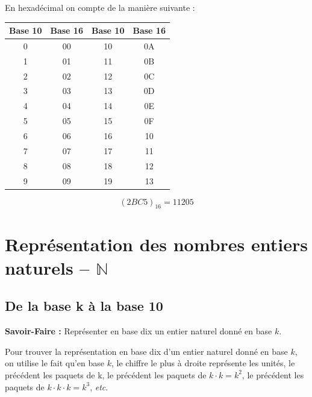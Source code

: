 \documentclass[10pt,fleqn]{article} %
\begin{document}
\begin{exemple}
\begin{minipage}[c]{.4\linewidth}
En hexadécimal on compte de la manière suivante : 
\begin{center}
\begin{tabular}{|c|c||c|c|}
\hline
Base 10 & Base 16 & Base 10 & Base 16\\
\hline \hline
0 & 00 & 10 & 0A \\ \hline
1 & 01 & 11 & 0B \\ \hline
2 & 02 & 12 & 0C \\ \hline
3 & 03 & 13 & 0D \\ \hline
4 & 04 & 14 & 0E \\ \hline
5 & 05 & 15 & 0F \\ \hline
6 & 06 & 16 & 10\\ \hline
7 & 07 & 17 & 11 \\ \hline
8 & 08 & 18 & 12 \\ \hline
9 & 09 & 19 & 13 \\ \hline
\end{tabular}
\end{center}
\end{minipage}%
\begin{minipage}{.57\linewidth}
$$\left(2BC5 \right)_{16} = 11 205$$
\end{minipage}
\end{exemple}

\section{Représentation des nombres entiers naturels -- $\mathbb{N}$}

\subsection{De la base k à la base 10}
\begin{resultat}
\textbf{Savoir-Faire :}
Représenter en base dix un entier naturel donné en base $k$.

Pour trouver la représentation en base dix d’un entier naturel donné en base $k$, on
utilise le fait qu’en base $k$, le chiffre le plus à droite représente les unités, le précédent
les paquets de k, le précédent les paquets de $k \cdot k = k^2$, le précédent les paquets de
$k \cdot k \cdot k = k^3$, \textit{etc}.
\end{resultat}
\end{document}
